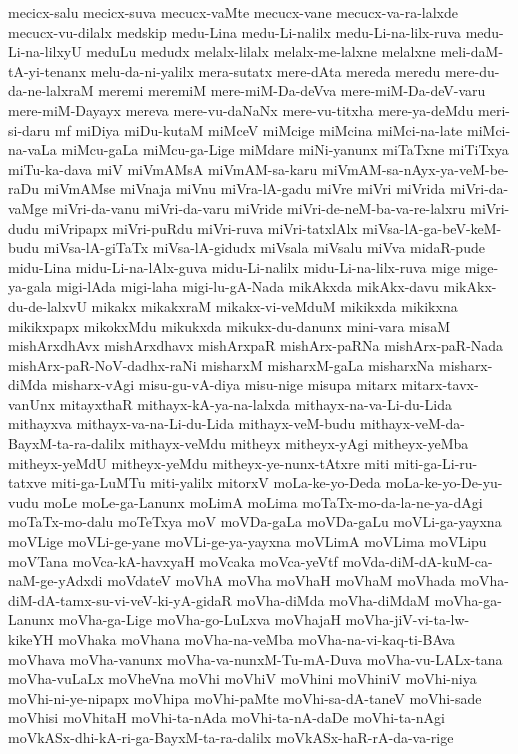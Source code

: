 {mecicx-salu
mecicx-suva
mecucx-vaMte
mecucx-vane
mecucx-va-ra-lalxde
mecucx-vu-dilalx
medskip
medu-Lina
medu-Li-nalilx
medu-Li-na-lilx-ruva
medu-Li-na-lilxyU
meduLu
medudx
melalx-lilalx
melalx-me-lalxne
melalxne
meli-daM-tA-yi-tenanx
melu-da-ni-yalilx
mera-sutatx
mere-dAta
mereda
meredu
mere-du-da-ne-lalxraM
meremi
meremiM
mere-miM-Da-deVva
mere-miM-Da-deV-varu
mere-miM-Dayayx
mereva
mere-vu-daNaNx
mere-vu-titxha
mere-ya-deMdu
meri-si-daru
mf
miDiya
miDu-kutaM
miMceV
miMcige
miMcina
miMci-na-late
miMci-na-vaLa
miMcu-gaLa
miMcu-ga-Lige
miMdare
miNi-yanunx
miTaTxne
miTiTxya
miTu-ka-dava
miV
miVmAMsA
miVmAM-sa-karu
miVmAM-sa-nAyx-ya-veM-be-raDu
miVmAMse
miVnaja
miVnu
miVra-lA-gadu
miVre
miVri
miVrida
miVri-da-vaMge
miVri-da-vanu
miVri-da-varu
miVride
miVri-de-neM-ba-va-re-lalxru
miVri-dudu
miVripapx
miVri-puRdu
miVri-ruva
miVri-tatxlAlx
miVsa-lA-ga-beV-keM-budu
miVsa-lA-giTaTx
miVsa-lA-gidudx
miVsala
miVsalu
miVva
midaR-pude
midu-Lina
midu-Li-na-lAlx-guva
midu-Li-nalilx
midu-Li-na-lilx-ruva
mige
mige-ya-gala
migi-lAda
migi-laha
migi-lu-gA-Nada
mikAkxda
mikAkx-davu
mikAkx-du-de-lalxvU
mikakx
mikakxraM
mikakx-vi-veMduM
mikikxda
mikikxna
mikikxpapx
mikokxMdu
mikukxda
mikukx-du-danunx
mini-vara
misaM
mishArxdhAvx
mishArxdhavx
mishArxpaR
mishArx-paRNa
mishArx-paR-Nada
mishArx-paR-NoV-dadhx-raNi
misharxM
misharxM-gaLa
misharxNa
misharx-diMda
misharx-vAgi
misu-gu-vA-diya
misu-nige
misupa
mitarx
mitarx-tavx-vanUnx
mitayxthaR
mithayx-kA-ya-na-lalxda
mithayx-na-va-Li-du-Lida
mithayxva
mithayx-va-na-Li-du-Lida
mithayx-veM-budu
mithayx-veM-da-BayxM-ta-ra-dalilx
mithayx-veMdu
mitheyx
mitheyx-yAgi
mitheyx-yeMba
mitheyx-yeMdU
mitheyx-yeMdu
mitheyx-ye-nunx-tAtxre
miti
miti-ga-Li-ru-tatxve
miti-ga-LuMTu
miti-yalilx
mitorxV
moLa-ke-yo-Deda
moLa-ke-yo-De-yu-vudu
moLe
moLe-ga-Lanunx
moLimA
moLima
moTaTx-mo-da-la-ne-ya-dAgi
moTaTx-mo-dalu
moTeTxya
moV
moVDa-gaLa
moVDa-gaLu
moVLi-ga-yayxna
moVLige
moVLi-ge-yane
moVLi-ge-ya-yayxna
moVLimA
moVLima
moVLipu
moVTana
moVca-kA-havxyaH
moVcaka
moVca-yeVtf
moVda-diM-dA-kuM-ca-naM-ge-yAdxdi
moVdateV
moVhA
moVha
moVhaH
moVhaM
moVhada
moVha-diM-dA-tamx-su-vi-veV-ki-yA-gidaR
moVha-diMda
moVha-diMdaM
moVha-ga-Lanunx
moVha-ga-Lige
moVha-go-LuLxva
moVhajaH
moVha-jiV-vi-ta-lw-kikeYH
moVhaka
moVhana
moVha-na-veMba
moVha-na-vi-kaq-ti-BAva
moVhava
moVha-vanunx
moVha-va-nunxM-Tu-mA-Duva
moVha-vu-LALx-tana
moVha-vuLaLx
moVheVna
moVhi
moVhiV
moVhini
moVhiniV
moVhi-niya
moVhi-ni-ye-nipapx
moVhipa
moVhi-paMte
moVhi-sa-dA-taneV
moVhi-sade
moVhisi
moVhitaH
moVhi-ta-nAda
moVhi-ta-nA-daDe
moVhi-ta-nAgi
moVkASx-dhi-kA-ri-ga-BayxM-ta-ra-dalilx
moVkASx-haR-rA-da-va-rige
}
